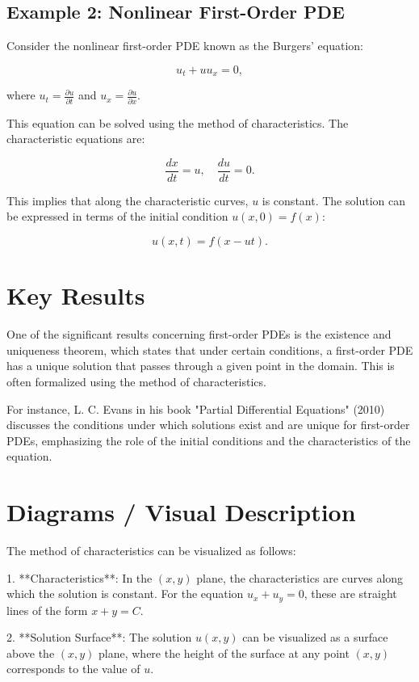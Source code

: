 \documentclass[11pt,a4paper]{article}
\begin{document}
\subsection{Example 2: Nonlinear First-Order PDE}
Consider the nonlinear first-order PDE known as the Burgers' equation:

$$
u_t + u u_x = 0,
$$

where \( u_t = \frac{\partial u}{\partial t} \) and \( u_x = \frac{\partial u}{\partial x} \).

This equation can be solved using the method of characteristics. The characteristic equations are:

$$
\frac{dx}{dt} = u, \quad \frac{du}{dt} = 0.
$$

This implies that along the characteristic curves, \( u \) is constant. The solution can be expressed in terms of the initial condition \( u(x, 0) = f(x) \):

$$
u(x, t) = f(x - ut).
$$

\section{Key Results}
One of the significant results concerning first-order PDEs is the existence and uniqueness theorem, which states that under certain conditions, a first-order PDE has a unique solution that passes through a given point in the domain. This is often formalized using the method of characteristics.

For instance, L. C. Evans in his book "Partial Differential Equations" (2010) discusses the conditions under which solutions exist and are unique for first-order PDEs, emphasizing the role of the initial conditions and the characteristics of the equation.

\section{Diagrams / Visual Description}
The method of characteristics can be visualized as follows:

1. **Characteristics**: In the \( (x, y) \) plane, the characteristics are curves along which the solution is constant. For the equation \( u_x + u_y = 0 \), these are straight lines of the form \( x + y = C \).

2. **Solution Surface**: The solution \( u(x, y) \) can be visualized as a surface above the \( (x, y) \) plane, where the height of the surface at any point \( (x, y) \) corresponds to the value of \( u \).
\end{document}
